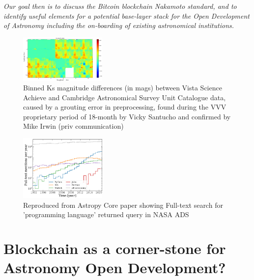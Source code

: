 \documentclass[final,5p,times,twocolumn,authoryear]{elsarticle}
\begin{document}
\emph{Our goal then is to discuss the Bitcoin blockchain Nakamoto standard, and to identify useful elements for a potential base-layer stack for the Open Development of Astronomy including the on-boarding of existing astronomical institutions.}

\begin{figure}
    \centering
    \includegraphics[width=0.38\textwidth]{figs/mapa_dif_Kvsa_Kcasu_grid80_1}
    \vspace*{-0.2cm}
    \caption{Binned Ks magnitude differences (in mags) between Vista Science Achieve and Cambridge Astronomical Survey Unit Catalogue data, caused by a grouting error in preprocessing, found during the VVV proprietary period of 18-month by Vicky Santucho and confirmed by Mike Irwin (priv communication)}
    \label{fig:mapa_dif_Kvsa_Kcasu_grid80_1}
\end{figure}


\begin{figure}
    \centering
    \includegraphics[width=0.38\textwidth]{figs/2206.14220.jpg}
    \vspace*{-0.3cm}
    \caption{Reproduced from Astropy Core paper showing Full-text search for 'programming language' returned query in NASA ADS}
    \label{fig:astropy}
\end{figure}

\section{Blockchain as a corner-stone for Astronomy Open Development?}
\label{sec:bc_review}
\end{document}
